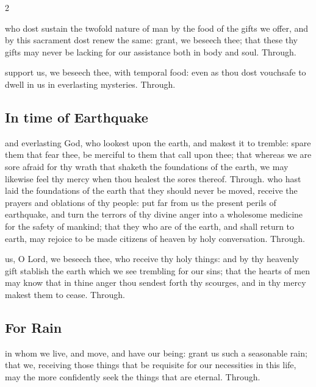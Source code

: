 \begin{multicols}{2}
\vspace{-0.25\baselineskip}

\secret

\vspace{-0.1\baselineskip}

 who dost sustain the twofold nature of man by the food of the gifts we offer, and by this sacrament dost renew the same: grant, we beseech thee; that these thy gifts may never be lacking for our assistance both in body and soul. Through.

\vspace{-0.25\baselineskip}

\postcommunion

\vspace{-0.05\baselineskip}

 support us, we beseech thee, with temporal food: even as thou dost vouchsafe to dwell in us in everlasting mysteries. Through.

   \newcolumn

\subsection{In time of Earthquake}
\collect
{} and everlasting God, who lookest upon the earth, and makest it to tremble: spare them that fear thee, be merciful to them that call upon thee; that whereas we are sore afraid for thy wrath that shaketh the foundations of the earth, we may likewise feel thy mercy when thou healest the sores thereof. Through.
\secret
{} who hast laid the foundations of the earth that they should never be moved, receive the prayers and oblations of thy people: put far from us the present perils of earthquake, and turn the terrors of thy divine anger into a wholesome medicine for the safety of mankind; that they who are of the earth, and shall return to earth, may rejoice to be made citizens of heaven by holy conversation. Through.

\postcommunion
{} us, O Lord, we beseech thee, who receive thy holy things: and by thy heavenly gift stablish the earth which we see trembling for our sins; that the hearts of men may know that in thine anger thou sendest forth thy scourges, and in thy mercy makest them to cease. Through.

   \newcolumn

\subsection{For Rain}
\collect
{} in whom we live, and move, and have our being: grant us such a seasonable rain; that we, receiving those things that be requisite for our necessities in this life, may the more confidently seek the things that are eternal. Through.


\end{multicols}
